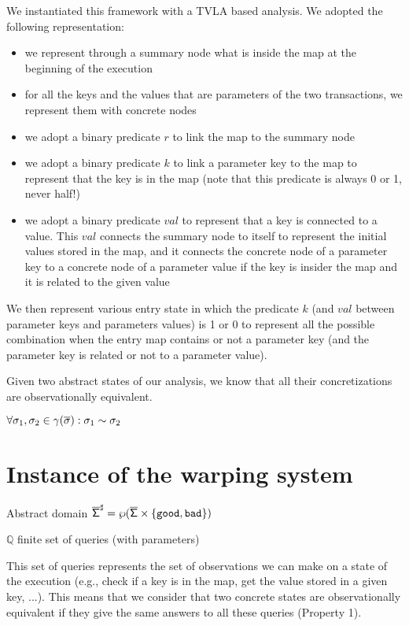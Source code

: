 We instantiated this framework with a TVLA based analysis. We adopted the following representation:
\begin{itemize}
\item we represent through a summary node what is inside the map at the beginning of the execution
\item for all the keys and the values that are parameters of the two transactions, we represent them with concrete nodes
\item we adopt a binary predicate $r$ to link the map to the summary node
\item we adopt a binary predicate $k$ to link a parameter key to the map to represent that the key is in the map (note that this predicate is always 0 or 1, never half!)
\item we adopt a binary predicate $val$ to represent that a key is connected to a value. This $val$ connects the summary node to itself to represent the initial values stored in the map, and it connects the concrete node of a parameter key to a concrete node of a parameter value if the key is insider the map and it is related to the given value
\end{itemize}

We then represent various entry state in which the predicate $k$ (and $val$ between parameter keys and parameters values) is 1 or 0 to represent all the possible combination when the entry map contains or not a parameter key (and the parameter key is related or not to a parameter value).

Given two abstract states of our analysis, we know that all their concretizations are observationally equivalent.

\begin{theorem}
$\forall \sigma_1, \sigma_2 \in \gamma({\mathsf{\overline{\sigma}}}) : \sigma_1 \sim \sigma_2$
\end{theorem}


\section{Instance of the warping system}

Abstract domain $\mathsf{\overline{\Sigma}}^{\sharp} = \wp(\mathsf{\overline{\Sigma}} \times \{\mathtt{good}, \mathtt{bad}\})$

$\mathbb{Q}$ finite set of queries (with parameters)

This set of queries represents the set of observations we can make on a state of the execution (e.g., check if a key is in the map, get the value stored in a given key, ...). This means that we consider that two concrete states are observationally equivalent if they give the same answers to all these queries (Property 1).

